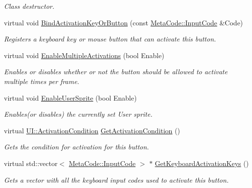 \begin{DoxyCompactItemize}
\begin{DoxyCompactList}\small\item\em Class destructor. \item\end{DoxyCompactList}\item 
virtual void \hyperlink{classMezzanine_1_1UI_1_1Button_aae0a7f6a07f79856ed6da8b8b3bc5ecd}{BindActivationKeyOrButton} (const \hyperlink{classMezzanine_1_1MetaCode_a3b5633f0145bf3287cf53a3f05b5563c}{MetaCode::InputCode} \&Code)
\begin{DoxyCompactList}\small\item\em Registers a keyboard key or mouse button that can activate this button. \item\end{DoxyCompactList}\item 
virtual void \hyperlink{classMezzanine_1_1UI_1_1Button_ab68c4ae03c41abb6d25179962f4e4f60}{EnableMultipleActivations} (bool Enable)
\begin{DoxyCompactList}\small\item\em Enables or disables whether or not the button should be allowed to activate multiple times per frame. \item\end{DoxyCompactList}\item 
virtual void \hyperlink{classMezzanine_1_1UI_1_1Button_af01bb0b214995c3cb6af06fcaa84975d}{EnableUserSprite} (bool Enable)
\begin{DoxyCompactList}\small\item\em Enables(or disables) the currently set User sprite. \item\end{DoxyCompactList}\item 
virtual \hyperlink{namespaceMezzanine_1_1UI_aca58497951b1b9c7da10f214da3392f0}{UI::ActivationCondition} \hyperlink{classMezzanine_1_1UI_1_1Button_a09b751800679937e1b1e79b33c164397}{GetActivationCondition} ()
\begin{DoxyCompactList}\small\item\em Gets the condition for activation for this button. \item\end{DoxyCompactList}\item 
virtual std::vector$<$ \hyperlink{classMezzanine_1_1MetaCode_a3b5633f0145bf3287cf53a3f05b5563c}{MetaCode::InputCode} $>$ $\ast$ \hyperlink{classMezzanine_1_1UI_1_1Button_ab0a32f06b46ae49813c9ad86e8346274}{GetKeyboardActivationKeys} ()
\begin{DoxyCompactList}\small\item\em Gets a vector with all the keyboard input codes used to activate this button. \item\end{DoxyCompactList}\item 

\end{DoxyCompactItemize}
